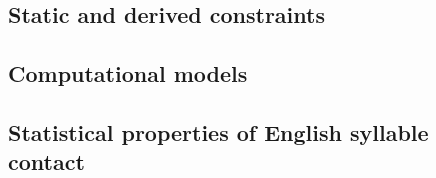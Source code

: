 
\subsection{Static and derived constraints}                     
\subsection{Computational models}                               
\subsection{Statistical properties of English syllable contact} 
